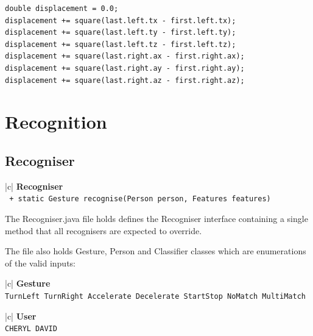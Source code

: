 \documentclass[12pt,a4,notitlepage]{report}
\renewcommand{\_}{\texttt{\symbol{95}}}
\newcommand{\<}{\texttt{\symbol{60}}}
\renewcommand{\>}{\texttt{\symbol{62}}}
\newcommand{\class}[1]{\textbf{#1}}
\newcommand{\variable}[1]{\texttt{#1}}
\begin{document}
{\begin{verbatim}
double displacement = 0.0;
displacement += square(last.left.tx - first.left.tx);
displacement += square(last.left.ty - first.left.ty);
displacement += square(last.left.tz - first.left.tz);
displacement += square(last.right.ax - first.right.ax);
displacement += square(last.right.ay - first.right.ay);
displacement += square(last.right.az - first.right.az);
\end{verbatim}

\newpage

\section{Recognition}

\subsection{Recogniser}

\begin{tabular}{|c|} \hline 
\class{Recogniser} \\ \hline
{}
{\variable{
+ static Gesture recognise(Person person, Features features)
 } } \\
\hline
\end{tabular}

The Recogniser.java file holds defines the Recogniser interface containing a single method that all recognisers are expected to override.

The file also holds Gesture, Person and Classifier classes which are enumerations of the valid inputs:

\begin{minipage}[t]{4cm}
\begin{tabular}{|c|} \hline 
\class{Gesture} \\ \hline
{}
{\variable{TurnLeft \newline TurnRight \newline Accelerate \newline Decelerate \newline StartStop \newline NoMatch \newline MultiMatch
} } \\ \hline
\end{tabular}
\end{minipage} \hfill

\begin{minipage}[t]{4cm}
\begin{tabular}{|c|} \hline 
\class{User} \\ \hline
{}
{\variable{CHERYL \newline DAVID
} } \\ \hline
\end{tabular}
\end{minipage} \hfill

}
\end{document}
